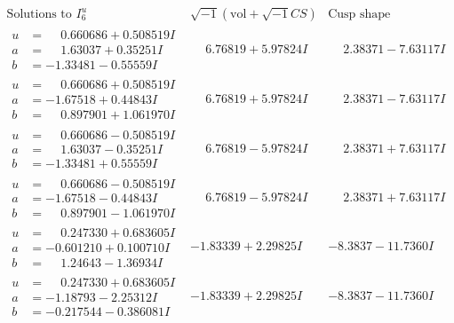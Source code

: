 \documentclass[1p]{elsarticle_modified}
\theoremstyle{definition}
\newcommand{\I}{\sqrt{-1}}
\begin{document}
$$\begin{array}{c|c|c}  
\text{Solutions to }I^u_{6}& \I (\text{vol} + \sqrt{-1}CS) & \text{Cusp shape}\\
 \hline 
\begin{aligned}
u &= \phantom{-}0.660686 + 0.508519 I \\
a &= \phantom{-}1.63037 + 0.35251 I \\
b &= -1.33481 - 0.55559 I\end{aligned}
 & \phantom{-}6.76819 + 5.97824 I & \phantom{-}2.38371 - 7.63117 I \\ \hline\begin{aligned}
u &= \phantom{-}0.660686 + 0.508519 I \\
a &= -1.67518 + 0.44843 I \\
b &= \phantom{-}0.897901 + 1.061970 I\end{aligned}
 & \phantom{-}6.76819 + 5.97824 I & \phantom{-}2.38371 - 7.63117 I \\ \hline\begin{aligned}
u &= \phantom{-}0.660686 - 0.508519 I \\
a &= \phantom{-}1.63037 - 0.35251 I \\
b &= -1.33481 + 0.55559 I\end{aligned}
 & \phantom{-}6.76819 - 5.97824 I & \phantom{-}2.38371 + 7.63117 I \\ \hline\begin{aligned}
u &= \phantom{-}0.660686 - 0.508519 I \\
a &= -1.67518 - 0.44843 I \\
b &= \phantom{-}0.897901 - 1.061970 I\end{aligned}
 & \phantom{-}6.76819 - 5.97824 I & \phantom{-}2.38371 + 7.63117 I \\ \hline\begin{aligned}
u &= \phantom{-}0.247330 + 0.683605 I \\
a &= -0.601210 + 0.100710 I \\
b &= \phantom{-}1.24643 - 1.36934 I\end{aligned}
 & -1.83339 + 2.29825 I & -8.3837 - 11.7360 I \\ \hline\begin{aligned}
u &= \phantom{-}0.247330 + 0.683605 I \\
a &= -1.18793 - 2.25312 I \\
b &= -0.217544 - 0.386081 I\end{aligned}
 & -1.83339 + 2.29825 I & -8.3837 - 11.7360 I \\ \hline\begin{aligned}

\end{aligned}
\end{array}$$
\end{document}
